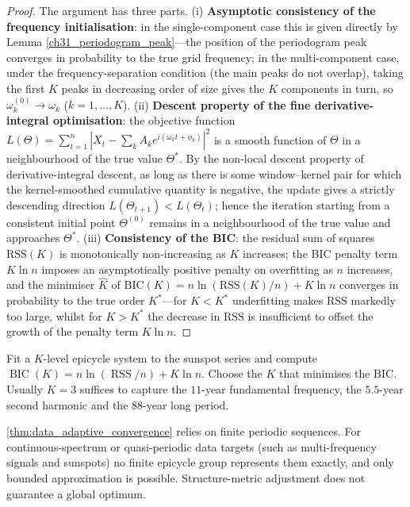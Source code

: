 \begin{proof}
The argument has three parts. (i) \textbf{Asymptotic consistency of the frequency initialisation}: in the single-component case this is given directly by Lemma \ref{ch31_periodogram_peak}---the position of the periodogram peak converges in probability to the true grid frequency; in the multi-component case, under the frequency-separation condition (the main peaks do not overlap), taking the first $K$ peaks in decreasing order of size gives the $K$ components in turn, so $\omega_k^{(0)} \to \omega_k$ ($k = 1,\dots,K$). (ii) \textbf{Descent property of the fine derivative-integral optimisation}: the objective function $L(\Theta) = \sum_{t=1}^{n} |X_t - \sum_k A_k e^{i(\omega_k t + \phi_k)}|^2$ is a smooth function of $\Theta$ in a neighbourhood of the true value $\Theta^*$. By the non-local descent property of derivative-integral descent, as long as there is some window--kernel pair for which the kernel-smoothed cumulative quantity is negative, the update gives a strictly descending direction $L(\Theta_{t+1}) < L(\Theta_t)$; hence the iteration starting from a consistent initial point $\Theta^{(0)}$ remains in a neighbourhood of the true value and approaches $\Theta^*$. (iii) \textbf{Consistency of the BIC}: the residual sum of squares $\text{RSS}(K)$ is monotonically non-increasing as $K$ increases; the BIC penalty term $K\ln n$ imposes an asymptotically positive penalty on overfitting as $n$ increases, and the minimiser $\hat{K}$ of $\text{BIC}(K) = n\ln(\text{RSS}(K)/n) + K\ln n$ converges in probability to the true order $K^*$---for $K < K^*$ underfitting makes $\text{RSS}$ markedly too large, whilst for $K > K^*$ the decrease in $\text{RSS}$ is insufficient to offset the growth of the penalty term $K\ln n$.
\end{proof}

\begin{example}\label{ex:data_bic}
Fit a $K$-level epicycle system to the sunspot series and compute $\operatorname{BIC}(K)=n\ln(\operatorname{RSS}/n)+K\ln n$. Choose the $K$ that minimises the BIC. Usually $K=3$ suffices to capture the $11$-year fundamental frequency, the $5.5$-year second harmonic and the $88$-year long period.
\end{example}

\begin{remark}\label{rem:data_adaptive_boundary}
\cref{thm:data_adaptive_convergence} relies on finite periodic sequences. For continuous-spectrum or quasi-periodic data targets (such as multi-frequency signals and sunspots) no finite epicycle group represents them exactly, and only bounded approximation is possible. Structure-metric adjustment does not guarantee a global optimum.
\end{remark}

